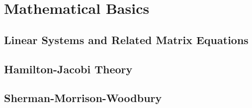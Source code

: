 \chapter{Mathematical Basics}
\section{Linear Systems and Related Matrix Equations}
\section{Hamilton-Jacobi Theory}
\section{Sherman-Morrison-Woodbury}

